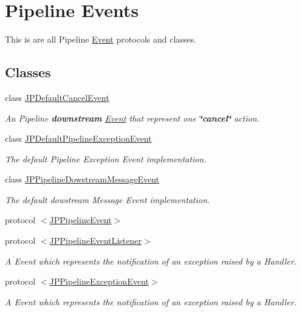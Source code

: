 \hypertarget{a00085}{
\section{Pipeline Events}
\label{a00085}
}


This is are all Pipeline \hyperlink{a00005}{Event} protocols and classes.  


\subsection*{Classes}
\begin{DoxyCompactItemize}
\item 
class \hyperlink{a00010}{JPDefaultCancelEvent}
\begin{DoxyCompactList}\small\item\em An Pipeline {\bfseries downstream} \hyperlink{a00005}{Event} that represent one {\bfseries \char`\"{}cancel\char`\"{}} action. \item\end{DoxyCompactList}\item 
class \hyperlink{a00013}{JPDefaultPipelineExceptionEvent}
\begin{DoxyCompactList}\small\item\em The default Pipeline Exception Event implementation. \item\end{DoxyCompactList}\item 
class \hyperlink{a00022}{JPPipelineDowstreamMessageEvent}
\begin{DoxyCompactList}\small\item\em The default dowstream Message Event implementation. \item\end{DoxyCompactList}\item 
protocol \hyperlink{a00023}{$<$JPPipelineEvent$>$}
\item 
protocol \hyperlink{a00025}{$<$JPPipelineEventListener$>$}
\begin{DoxyCompactList}\small\item\em A Event which represents the notification of an exception raised by a Handler. \item\end{DoxyCompactList}\item 
protocol \hyperlink{a00027}{$<$JPPipelineExceptionEvent$>$}
\begin{DoxyCompactList}\small\item\em A Event which represents the notification of an exception raised by a Handler. \item\end{DoxyCompactList}\item 

\end{DoxyCompactItemize}

